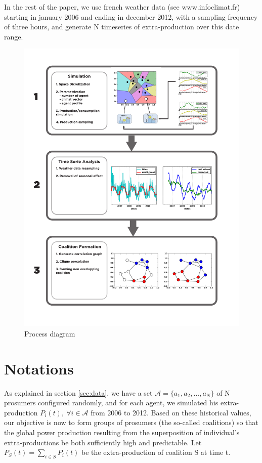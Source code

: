 \documentclass[conference]{IEEEtran}
\begin{document}
In the rest of the paper, we use french weather data (see www.infoclimat.fr) starting in january 2006 and ending in december 2012, with a sampling frequency of three hours, and generate N timeseries of extra-production over this date range.

\begin{figure}
\includegraphics[scale=.45]{Fig2.pdf}
\caption{Process diagram}
\label{fig:process}
\end{figure}



%
%

\section{Notations}
\label{sec:notations}

As explained in section \ref{sec:data}, we have a set $ \mathcal{A} = \{a_{1},a_{2},...,a_{N} \} $ of N prosumers configured randomly, and for each agent, we simulated his extra-production $ P_{i}(t),\ \forall i \in \mathcal{A} $ from 2006 to 2012. Based on these historical values, our objective is now to form groups of prosumers (the so-called coalitions) so that the global power production resulting from the superposition of individual's extra-productions be both sufficiently high and predictable. Let $ P_{S}(t) = \sum_{i \in S} P_{i}(t) $ be the extra-production of coalition S at time t. 
\end{document}
